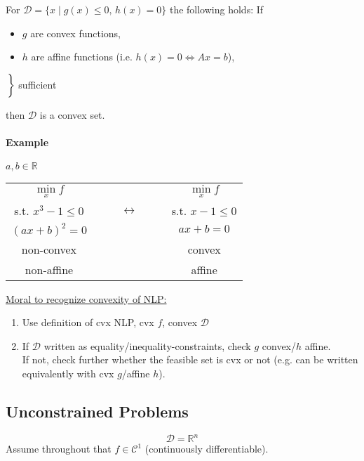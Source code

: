 \documentclass[12pt,a4paper,oneside]{scrartcl}
\begin{document}
	For $\mathcal{D} = \{ x \mid g(x) \leq 0, \, h(x) = 0 \}$ the following holds: If
	
	\begin{minipage}{0.65\textwidth}
		\begin{itemize}
			\item $g$ are convex functions,
			\item $h$ are affine functions (i.e. $h(x) = 0 \Leftrightarrow Ax=b$),
		\end{itemize}
	\end{minipage}
	\begin{minipage}{0.15\textwidth}
		$\left.\vphantom{\begin{array}{l}g\\h\end{array}}\right\}$ sufficient
	\end{minipage}
	
	
	then $\mathcal{D}$ is a convex set.
	
	\paragraph{Example} $a,b\in\mathbb{R}$
	
	\begin{table}[H]
		\centering
		\begin{tabular}{c c c}
			$\underset{x}{\min}f$ & & $\underset{x}{\min}f$\\
			s.t. $x^3-1\leq0$ & $\qquad\leftrightarrow\qquad$ & s.t. $x-1\leq0$\\
			$(ax+b)^2=0$ & & $ax+b=0$\\
			non-convex & & convex\\
			non-affine & & affine
		\end{tabular}
	\end{table}
	
	\underline{Moral to recognize convexity of NLP:}
	\begin{enumerate}
		\item Use definition of cvx NLP, cvx $f$, convex $\mathcal{D}$
		\item If $\mathcal{D}$ written as equality/inequality-constraints, check $g$ convex/$h$ affine.\\
		If not, check further whether the feasible set is cvx or not (e.g. can be written equivalently with cvx $g$/affine $h$).
	\end{enumerate}
	
	\subsection{Unconstrained Problems}
	\[
		\mathcal{D} = \mathbb{R}^n
	\]
	Assume throughout that $f \in \mathcal{C}^1$ (continuously differentiable).
	
\end{document}
